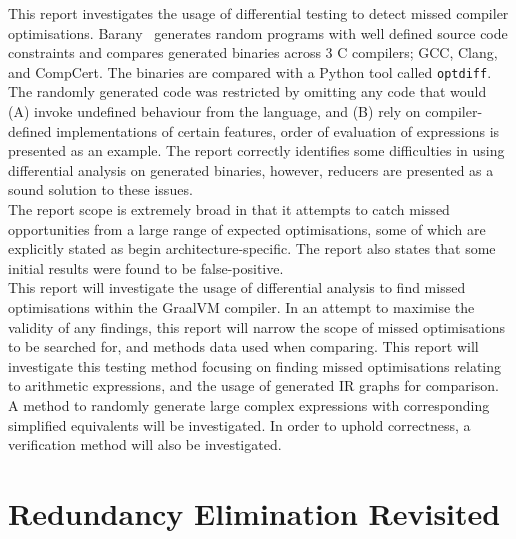 \documentclass[12pt,openany,a4paper]{book}
\begin{document}
This report investigates the usage of differential testing to detect missed
compiler optimisations. Barany~\cite{missed-opt} generates random programs with well defined
source code constraints and compares generated binaries across 3 C compilers; GCC,
Clang, and CompCert. The binaries are compared with a Python tool called 
\verb|optdiff|. The randomly generated code was restricted by omitting any code
that would (A) invoke undefined behaviour from the language, and (B) rely on 
compiler-defined implementations of certain features, order of evaluation of
expressions is presented as an example. The report correctly identifies some 
difficulties in using differential analysis on generated binaries, however, 
reducers are presented as a sound solution to these issues.\\
The report scope is extremely broad in that it attempts to catch missed
opportunities from a large range of expected optimisations, some of which are
explicitly stated as begin architecture-specific. The report also states that
some initial results were found to be false-positive.\\
This report will investigate the usage of differential analysis to find missed optimisations within the 
GraalVM compiler. In an attempt to maximise the validity of any findings, this report
will narrow the scope of missed optimisations to be searched for, and methods
data used when comparing. This report will investigate this testing method
focusing on finding missed optimisations relating to arithmetic expressions, and
the usage of generated IR graphs for comparison. A method to randomly generate
large complex expressions with corresponding simplified equivalents will be
investigated. In order to uphold correctness, a verification method will also 
be investigated.

\section{Redundancy Elimination Revisited}
\label{litrev3}
\end{document}
